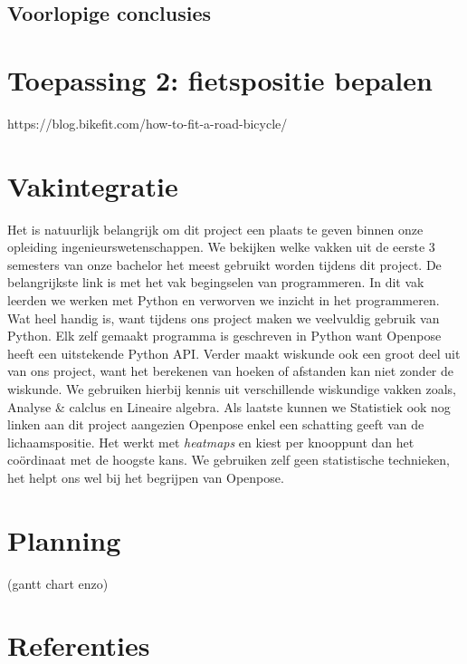 \documentclass{article}
\begin{document}
	\subsection{Voorlopige conclusies}

\section{Toepassing 2: fietspositie bepalen}

https://blog.bikefit.com/how-to-fit-a-road-bicycle/

\section{Vakintegratie}
Het is natuurlijk belangrijk om dit project een plaats te geven binnen onze opleiding ingenieurswetenschappen. We bekijken welke vakken uit de eerste 3 semesters van onze bachelor het meest gebruikt worden tijdens dit project. De belangrijkste link is met het vak begingselen van programmeren. In dit vak leerden we werken met Python en verworven we inzicht in het programmeren. Wat heel handig is, want tijdens ons project maken we veelvuldig gebruik van Python. Elk zelf gemaakt programma is geschreven in Python want Openpose heeft een uitstekende Python API. Verder maakt wiskunde ook een groot deel uit van ons project, want het berekenen van hoeken of afstanden kan niet zonder de wiskunde. We gebruiken hierbij kennis uit verschillende wiskundige vakken zoals, Analyse \& calclus en Lineaire algebra. Als laatste kunnen we Statistiek ook nog linken aan dit project aangezien Openpose enkel een schatting geeft van de lichaamspositie. Het werkt met \textit{heatmaps} en kiest per knooppunt dan het coördinaat met de hoogste kans. We gebruiken zelf geen statistische technieken, het helpt ons wel bij het begrijpen van Openpose.
\section{Planning}
(gantt chart enzo\texttt{})

\section{Referenties}
\end{document}

